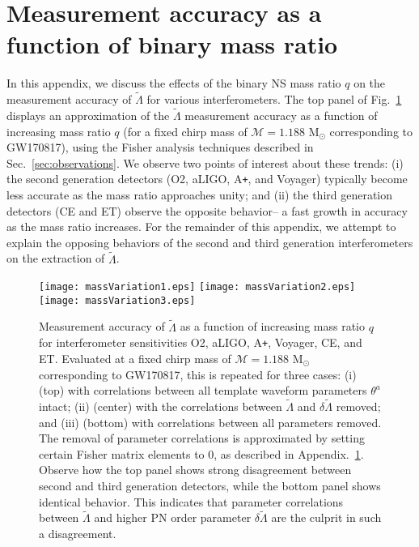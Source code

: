 \documentclass[prd,twocolumn,nofootinbib,superscriptaddress,amsmath,amssymb]{revtex4-1}
\begin{document}
\section{Measurement accuracy as a function of binary mass ratio}\label{app:measurement}
In this appendix, we discuss the effects of the binary NS mass ratio $q$ on the measurement accuracy of $\tilde\Lambda$ for various interferometers. 
The top panel of Fig.~\ref{fig:massVariation} displays an approximation of the $\tilde\Lambda$ measurement accuracy as a function of increasing mass ratio $q$ (for a fixed chirp mass of $\mathcal{M}=1.188 \text{ M}_{\odot}$ corresponding to GW170817), using the Fisher analysis techniques described in Sec.~\ref{sec:observations}.
We observe two points of interest about these trends: (i) the second generation detectors (O2, aLIGO, A\texttt{+}, and Voyager) typically become less accurate as the mass ratio approaches unity; and (ii) the third generation detectors (CE and ET) observe the opposite behavior-- a fast growth in accuracy as the mass ratio increases.
For the remainder of this appendix, we attempt to explain the opposing behaviors of the second and third generation interferometers on the extraction of $\tilde\Lambda$.

\begin{figure}
\begin{center} 
\texttt{[image: massVariation1.eps]}
\texttt{[image: massVariation2.eps]}
\texttt{[image: massVariation3.eps]}
\end{center}
\caption{
Measurement accuracy of $\tilde\Lambda$ as a function of increasing mass ratio $q$ for interferometer sensitivities O2, aLIGO, A\texttt{+}, Voyager, CE, and ET.
Evaluated at a fixed chirp mass of $\mathcal{M}=1.188\text{ M}_{\odot}$ corresponding to GW170817, this is repeated for three cases: (i) (top) with correlations between all template waveform parameters $\theta^a$ intact; (ii) (center) with the correlations between $\tilde\Lambda$ and $\delta\tilde\Lambda$ removed; and (iii) (bottom) with correlations between all parameters removed.
The removal of parameter correlations is approximated by setting certain Fisher matrix elements to 0, as described in Appendix.~\ref{app:measurement}.
Observe how the top panel shows strong disagreement between second and third generation detectors, while the bottom panel shows identical behavior.
This indicates that parameter correlations between $\tilde\Lambda$ and higher PN order parameter $\delta\tilde\Lambda$ are the culprit in such a disagreement.
}
\label{fig:massVariation}
\end{figure} 
\end{document}
